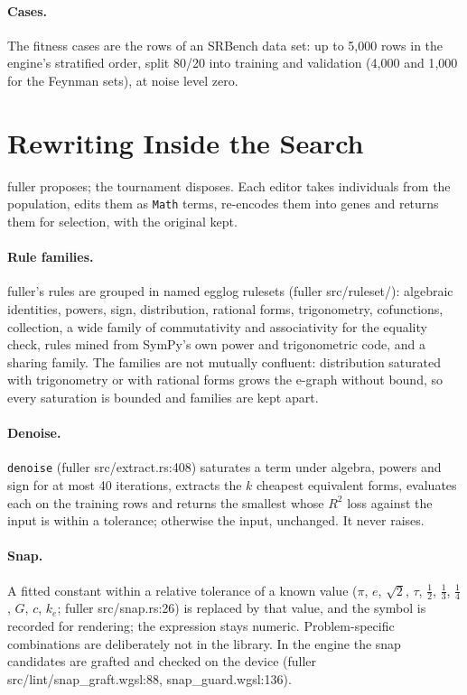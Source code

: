 \documentclass[sigconf,nonacm]{acmart}
\newcommand{\src}[1]{{\small\ttfamily #1}}
\begin{document}
\paragraph{Cases.} The fitness cases are the rows of an SRBench data set: up to
5{,}000 rows in the engine's stratified order, split 80/20 into training and
validation (4{,}000 and 1{,}000 for the Feynman sets), at noise level zero.

\section{Rewriting Inside the Search}
\label{sec:editors}

fuller proposes; the tournament disposes. Each editor takes individuals from the
population, edits them as \texttt{Math} terms, re-encodes them into genes and
returns them for selection, with the original kept.

\paragraph{Rule families.} fuller's rules are grouped in named egglog rulesets
(\src{fuller src/\allowbreak{}ruleset/\allowbreak{}}): algebraic identities, powers, sign,
distribution, rational forms, trigonometry, cofunctions, collection, a wide
family of commutativity and associativity for the equality check, rules mined
from SymPy's own power and trigonometric code, and a sharing family. The
families are not mutually confluent: distribution saturated with trigonometry or
with rational forms grows the e-graph without bound, so every saturation is
bounded and families are kept apart.

\paragraph{Denoise.} \texttt{denoise} (\src{fuller src/\allowbreak{}extract.\allowbreak{}rs:408})
saturates a term under algebra, powers and sign for at most 40 iterations,
extracts the $k$ cheapest equivalent forms, evaluates each on the training rows
and returns the smallest whose $R^2$ loss against the input is within a
tolerance; otherwise the input, unchanged. It never raises.

\paragraph{Snap.} A fitted constant within a relative tolerance of a known value
($\pi$, $e$, $\sqrt2$, $\tau$, $\tfrac12$, $\tfrac13$, $\tfrac14$, $G$, $c$,
$k_e$; \src{fuller src/\allowbreak{}snap.\allowbreak{}rs:26}) is replaced by that value, and the symbol is
recorded for rendering; the expression stays numeric. Problem-specific
combinations are deliberately not in the library. In the engine the snap
candidates are grafted and checked on the device (\src{fuller
src/\allowbreak{}lint/\allowbreak{}snap\_\allowbreak{}graft.\allowbreak{}wgsl:88}, \src{snap\_\allowbreak{}guard.\allowbreak{}wgsl:136}).
\end{document}
